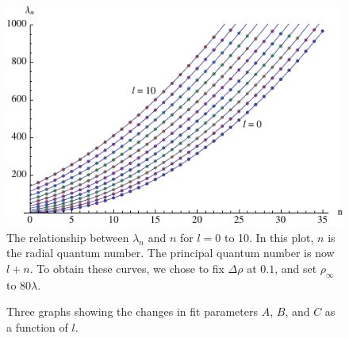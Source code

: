 \documentclass[12pt,twoside]{reedthesis}
\begin{document}
\begin{figure}[h]
\centering
\includegraphics{Figures/allthelcs}
\caption[Plots of $\lambda_n$ versus $n$ for $l = 0$ to $10$]{The relationship between $\lambda_n$ and $n$ for $l = 0$ to 10. In this plot, $n$ is the radial quantum number. The principal quantum number is now $l + n$. To obtain these curves, we chose to fix $\Delta \rho$ at $0.1$, and set $\rho_{\infty}$ to $80 \lambda$.}
\label{fig:allthelcs}
\end{figure}
\begin{figure}[h]
\centering {}
\caption[Fit parameters for $l = 0$ to 10]{Three graphs showing the changes in fit parameters $A$, $B$, and $C$ as a function of $l$.}
\label{fig:parameters}
\end{figure}
\end{document}
